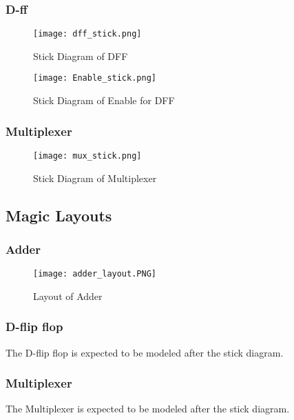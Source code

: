 \documentclass{article}
\begin{document}
\subsubsection{D-ff}

\begin{figure}[H]
    \centering
    \texttt{[image: dff\_stick.png]}
    \caption{Stick Diagram of DFF}
    \label{fig:dff_stick}
\end{figure}
\begin{figure}[H]
    \centering
    \texttt{[image: Enable\_stick.png]}
    \caption{Stick Diagram of Enable for DFF}
    \label{fig:en_stick}
\end{figure}


\subsubsection{Multiplexer}

\begin{figure}[H]
    \centering
    \texttt{[image: mux\_stick.png]}
    \caption{Stick Diagram of Multiplexer}
    \label{fig:mux_stick}
\end{figure}

\subsection{Magic Layouts}

\subsubsection{Adder}

\begin{figure}[H]
    \centering
    \texttt{[image: adder\_layout.PNG]}
    \caption{Layout of Adder}
    \label{fig:add_layout}
\end{figure}

\subsubsection{D-flip flop}
The D-flip flop is expected to be modeled after the stick diagram.
\subsubsection{Multiplexer }
The Multiplexer is expected to be modeled after the stick diagram.


\end{document}
